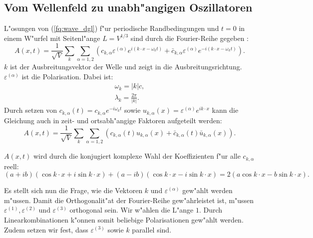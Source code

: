 \begin{refsection}
\section{Vom Wellenfeld zu unabh"angigen Oszillatoren}
L"osungen von (\ref{fq:wave_dgl}) f"ur periodische Randbedingungen und $t=0$ in einem W"urfel mit Seitenl"ange $L = V^{1/3}$ sind durch die Fourier-Reihe gegeben \cite{fq:em_wave_eq}:
\begin{equation} \label{fq:wave_eq}
A(x,t) = \frac{1}{\sqrt{V}} \sum_k \sum_{\alpha=1,2} \left(c_{k,\alpha} \varepsilon^{(\alpha)} e^{i (k \cdot x - \omega_k t)} + \bar{c}_{k,\alpha} \varepsilon^{(\alpha)} e^{-i(k \cdot x - \omega_k t)}\right).
\end{equation}
$k$ ist der Ausbreitungsvektor der Welle und zeigt in die Ausbreitungsrichtung. $\varepsilon^{(\alpha)}$ ist die Polarisation. Dabei ist:
\begin{align*}
\omega_k=|k|c, \\
\lambda_k = \frac{2 \pi}{|k|}.
\end{align*}
Durch setzen von $c_{k,\alpha}(t) = c_{k,\alpha} e^{-i \omega_k t}$ sowie $u_{k,\alpha}(x) = \varepsilon^{(\alpha)} e^{ik \cdot x}$ kann die Gleichung auch in zeit- und ortsabh"angige Faktoren aufgeteilt werden:
\begin{equation*}
A(x,t) = \frac{1}{\sqrt{V}} \sum_k \sum_{\alpha=1,2} \left(c_{k,\alpha}(t)u_{k,\alpha}(x) + \bar{c}_{k,\alpha}(t) \bar{u}_{k,\alpha}(x) \right).
\end{equation*}

$A(x,t)$ wird durch die konjugiert komplexe Wahl der Koeffizienten f"ur alle $c_{k,\alpha}$ reell:
\begin{equation*}
(a + ib)(\cos k \cdot x + i \sin k \cdot x ) + (a - ib)(\cos k \cdot x - i \sin k \cdot x ) = 2 ( a \cos k \cdot x - b \sin k \cdot x ).
\end{equation*}

Es stellt sich nun die Frage, wie die Vektoren $k$ und $\varepsilon^{(\alpha)}$ gew"ahlt werden m"ussen. Damit die Orthogonalit"at der Fourier-Reihe gew"ahrleistet ist, m"ussen $\varepsilon^{(1)}, \varepsilon^{(2)} \text{ und } \varepsilon^{(3)}$ orthogonal sein. Wir w"ahlen die L"ange $1$. Durch Linearkombinationen k"onnen somit beliebige Polarisationen gew"ahlt werden. Zudem setzen wir fest, dass $\varepsilon^{(3)}$ sowie $k$ parallel sind.


\end{refsection}
